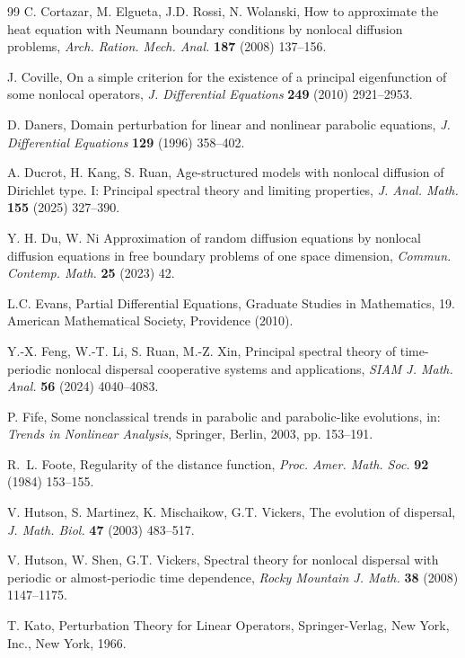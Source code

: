 \documentclass[11pt,reqno]{amsart}
\numberwithin{equation}{section}
\begin{document}
\begin{thebibliography}{99}
 C. Cortazar, M. Elgueta, J.D. Rossi, N. Wolanski, How to approximate the heat equation with Neumann boundary
conditions by nonlocal diffusion problems, \emph{Arch. Ration. Mech. Anal.} {\bf 187} (2008) 137--156.

	J. Coville, On a simple criterion for the existence of a principal eigenfunction of some nonlocal operators, \emph{J. Differential Equations} {\bf 249} (2010) 2921--2953.

 D. Daners, Domain perturbation for linear and nonlinear parabolic equations,  \emph{J. Differential Equations} {\bf 129} (1996) 358--402.


A. Ducrot, H. Kang, S. Ruan, Age-structured models with nonlocal diffusion of Dirichlet type. I: Principal spectral theory and limiting properties, \emph{J. Anal. Math.} {\bf 155} (2025) 327--390.


	
 Y. H. Du, W. Ni Approximation of random diffusion equations by nonlocal diffusion equations in free boundary problems of one space dimension, \emph{Commun. Contemp. Math.} {\bf 25} (2023) 42.

 L.C. Evans, Partial Differential Equations, Graduate Studies in Mathematics, 19. American Mathematical
Society, Providence (2010).

Y.-X. Feng, W.-T. Li, S. Ruan, M.-Z. Xin, Principal spectral theory of time-periodic nonlocal dispersal cooperative systems and applications, \emph{SIAM J. Math. Anal.} {\bf 56} (2024) 4040--4083.

P. Fife, Some nonclassical trends in parabolic and parabolic-like evolutions, in: \emph{Trends in Nonlinear Analysis},
Springer, Berlin, 2003, pp. 153--191.

 R.~L. Foote, Regularity of the distance function, \emph {Proc. Amer. Math. Soc.} {\bf 92} (1984) 153--155.


 V. Hutson, S. Martinez, K. Mischaikow, G.T. Vickers, The evolution of dispersal, \emph{J. Math. Biol.} {\bf 47} (2003) 483--517.

 V. Hutson, W. Shen, G.T. Vickers, Spectral theory for nonlocal dispersal with periodic or almost-periodic time dependence, \emph{Rocky Mountain J. Math.} {\bf 38} (2008) 1147--1175.

T. Kato, Perturbation Theory for Linear Operators, Springer-Verlag, New York, Inc., New York, 1966.




\end{thebibliography}
\end{document}
